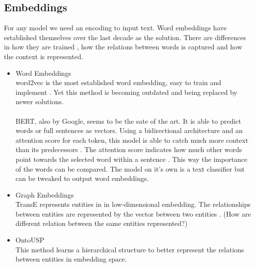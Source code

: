 \subsection{Embeddings}
For any model we need an encoding to input text. Word embeddings have established themselves over the last decade as the solution. There are differences in how they are trained , how the relations between words is captured and how the context is represented.
\begin{itemize}
    \item Word Embeddings\\
    word2vec is the most established word embedding, easy to train and implement \cite{mikolov_efficient_2013}. Yet this method is becoming outdated and being replaced by newer solutions. \\
    \\BERT, also by Google, seems to be the sate of the art. It is able to predict words or full sentences as vectors. Using a bidirectional architecture and an attention score for each token, this model is able to catch much more context than its predecessors \cite{devlin_bert_2019}. The attention score indicates how much other words point towards the selected word within a sentence \cite{vaswani_attention_2017}. This way the importance of the words can be compared. The model on it's own is a text classifier but can be tweaked to output word embeddings.
    \item Graph Embeddings\\
    TransE represents entities in in low-dimensional embedding. The relationships between entities are represented by the vector between two entities \cite{bordes_translating_2013}.
    (How are different relation between the same entities represented?)
    \item OntoUSP\\
    This method learns a hierarchical structure to better represent the relations between entities in embedding space.
\end{itemize}

